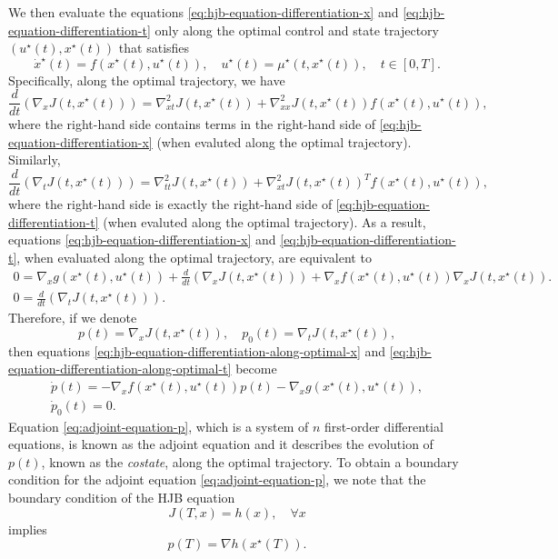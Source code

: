 \documentclass[
]{book}
\theoremstyle{definition}
\theoremstyle{definition}
\theoremstyle{definition}
\theoremstyle{definition}
\theoremstyle{remark}
\begin{document}
We then evaluate the equations \eqref{eq:hjb-equation-differentiation-x} and \eqref{eq:hjb-equation-differentiation-t} only along the optimal control and state trajectory \((u^\star(t),x^\star(t))\) that satisfies
\begin{equation}
\dot{x}^\star(t) = f(x^\star(t),u^\star(t)), \quad u^\star(t) = \mu^\star(t,x^\star(t)), \quad t \in [0,T].
\label{eq:pmp-optimal-system-dynamics}
\end{equation}
Specifically, along the optimal trajectory, we have
\[
\frac{d}{dt} \left( \nabla_x J(t,x^\star(t)) \right) = \nabla^2_{xt} J(t,x^\star(t)) + \nabla^2_{xx} J(t,x^\star(t))f(x^\star(t),u^\star(t)),
\]
where the right-hand side contains terms in the right-hand side of \eqref{eq:hjb-equation-differentiation-x} (when evaluted along the optimal trajectory). Similarly,
\[
\frac{d}{dt} \left( \nabla_t J(t,x^\star(t)) \right) = \nabla^2_{tt} J(t,x^\star(t)) + \nabla^2_{xt} J(t,x^\star(t))^T f(x^\star(t),u^\star(t)),
\]
where the right-hand side is exactly the right-hand side of \eqref{eq:hjb-equation-differentiation-t} (when evaluted along the optimal trajectory). As a result, equations \eqref{eq:hjb-equation-differentiation-x} and \eqref{eq:hjb-equation-differentiation-t}, when evaluated along the optimal trajectory, are equivalent to
\begin{align}
\label{eq:hjb-equation-differentiation-along-optimal-x}
0 = \nabla_x g(x^\star(t), u^\star(t)) + \frac{d}{dt}\left( \nabla_x J(t,x^\star(t)) \right) + \nabla_x f(x^\star(t),u^\star(t)) \nabla_x J(t,x^\star(t)).\\
0 = \frac{d}{dt}\left( \nabla_t J(t,x^\star(t)) \right).
\label{eq:hjb-equation-differentiation-along-optimal-t}
\end{align}
Therefore, if we denote
\[
p(t) = \nabla_x J(t,x^\star(t)), \quad p_0(t) = \nabla_t J(t,x^\star(t)),
\]
then equations \eqref{eq:hjb-equation-differentiation-along-optimal-x} and \eqref{eq:hjb-equation-differentiation-along-optimal-t} become
\begin{align}
\label{eq:adjoint-equation-p}
\dot{p}(t) = - \nabla_x f(x^\star(t),u^\star(t)) p(t) - \nabla_x g(x^\star(t),u^\star(t)), \\
\dot{p}_0(t) = 0.
\label{eq:adjoint-equation-p0}
\end{align}
Equation \eqref{eq:adjoint-equation-p}, which is a system of \(n\) first-order differential equations, is known as the adjoint equation and it describes the evolution of \(p(t)\), known as the \emph{costate}, along the optimal trajectory. To obtain a boundary condition for the adjoint equation \eqref{eq:adjoint-equation-p}, we note that the boundary condition of the HJB equation
\[
J(T,x) = h(x),\quad \forall x
\]
implies
\[
p(T) = \nabla h(x^\star(T)).
\]
\end{document}
